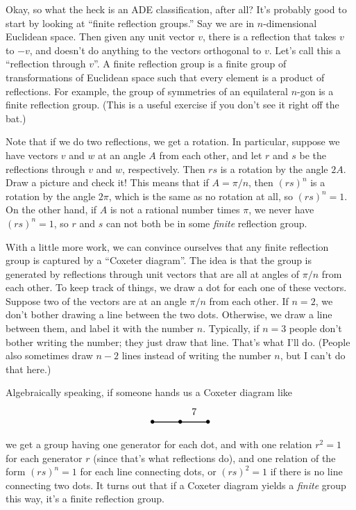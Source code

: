 \documentclass{article}
\begin{document}
Okay, so what the heck is an ADE classification, after all? It's
probably good to start by looking at ``finite reflection groups.'' Say
we are in \(n\)-dimensional Euclidean space. Then given any unit vector
\(v\), there is a reflection that takes \(v\) to \(-v\), and doesn't do
anything to the vectors orthogonal to \(v\). Let's call this a
``reflection through \(v\)''. A finite reflection group is a finite
group of transformations of Euclidean space such that every element is a
product of reflections. For example, the group of symmetries of an
equilateral \(n\)-gon is a finite reflection group. (This is a useful
exercise if you don't see it right off the bat.)

Note that if we do two reflections, we get a rotation. In particular,
suppose we have vectors \(v\) and \(w\) at an angle \(A\) from each
other, and let \(r\) and \(s\) be the reflections through \(v\) and
\(w\), respectively. Then \(rs\) is a rotation by the angle \(2A\). Draw
a picture and check it! This means that if \(A = \pi / n\), then
\((rs)^n\) is a rotation by the angle \(2\pi\), which is the same as no
rotation at all, so \((rs)^n = 1\). On the other hand, if \(A\) is not a
rational number times \(\pi\), we never have \((rs)^n = 1\), so \(r\)
and \(s\) can not both be in some \emph{finite} reflection group.

With a little more work, we can convince ourselves that any finite
reflection group is captured by a ``Coxeter diagram''. The idea is that
the group is generated by reflections through unit vectors that are all
at angles of \(\pi/n\) from each other. To keep track of things, we draw
a dot for each one of these vectors. Suppose two of the vectors are at
an angle \(\pi/n\) from each other. If \(n = 2\), we don't bother
drawing a line between the two dots. Otherwise, we draw a line between
them, and label it with the number \(n\). Typically, if \(n = 3\) people
don't bother writing the number; they just draw that line. That's what
I'll do. (People also sometimes draw \(n - 2\) lines instead of writing
the number \(n\), but I can't do that here.)

Algebraically speaking, if someone hands us a Coxeter diagram like \[
  \begin{tikzpicture}
    \draw[thick] (0,0) node{$\bullet$} to (1,0) node{$\bullet$} to node[label=above:{7}]{} (2,0) node {$\bullet$};
  \end{tikzpicture}
\] we get a group having one generator for each dot, and with one
relation \(r^2 = 1\) for each generator \(r\) (since that's what
reflections do), and one relation of the form \((rs)^n = 1\) for each
line connecting dots, or \((rs)^2 = 1\) if there is no line connecting
two dots. It turns out that if a Coxeter diagram yields a \emph{finite}
group this way, it's a finite reflection group.
\end{document}
